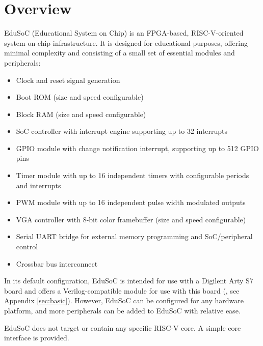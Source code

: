 \maketitle

\section*{Overview}\label{sec:overview}
EduSoC (Educational System on Chip) is an FPGA-based, RISC-V-oriented system-on-chip infrastructure.
It is designed for educational purposes, offering minimal complexity and consisting of a small set of essential modules and peripherals:
\begin{itemize}
    \item Clock and reset signal generation
    \item Boot ROM (size and speed configurable)
    \item Block RAM (size and speed configurable)
    \item SoC controller with interrupt engine supporting up to 32 interrupts
    \item GPIO module with change notification interrupt, supporting up to 512 GPIO pins
    \item Timer module with up to 16 independent timers with configurable periods and interrupts
    \item PWM module with up to 16 independent pulse width modulated outputs
    \item VGA controller with 8-bit color framebuffer (size and speed configurable)
    \item Serial UART bridge for external memory programming and SoC/peripheral control
    \item Crossbar bus interconnect
\end{itemize}
In its default configuration, EduSoC is intended for use with a Digilent Arty S7 board and offers a Verilog-compatible module for use with this board (, see Appendix \ref{sec:basic}). However, EduSoC can be configured for any hardware platform, and more peripherals can be added to EduSoC with relative ease.

EduSoC does not target or contain any specific RISC-V core. A simple core interface is provided.

\newpage
\tableofcontents
\listoffigures
\listoftables
\newpage

